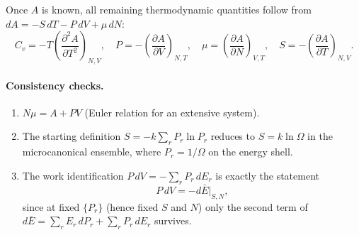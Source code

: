 Once $A$ is known, all remaining thermodynamic quantities follow from $dA = -S\,dT - P\,dV + \mu\,dN$:
\[
    C_v = -T\!\left(\frac{\partial^{2} A}{\partial T^{2}}\right)_{N,V},\quad
    P = -\!\left(\frac{\partial A}{\partial V}\right)_{N,T},\quad
    \mu = \!\left(\frac{\partial A}{\partial N}\right)_{V,T},\quad
    S = -\!\left(\frac{\partial A}{\partial T}\right)_{N,V}.
\]

\paragraph{Consistency checks.}
\begin{enumerate}[label=(\arabic*)]
    \item $N\mu = A + PV$ (Euler relation for an extensive system).
    \item The starting definition $S = -k\sum_r P_r\ln P_r$ reduces to $S = k\ln\Omega$ in the microcanonical ensemble, where $P_r = 1/\Omega$ on the energy shell.
    \item The work identification $P\,dV = -\sum_r P_r\,dE_r$ is exactly the statement
    \[
        P\,dV = -d\bar E\big|_{S,N},
    \]
    since at fixed $\{P_r\}$ (hence fixed $S$ and $N$) only the second term of $d\bar E = \sum_r E_r\,dP_r + \sum_r P_r\,dE_r$ survives.
\end{enumerate}
